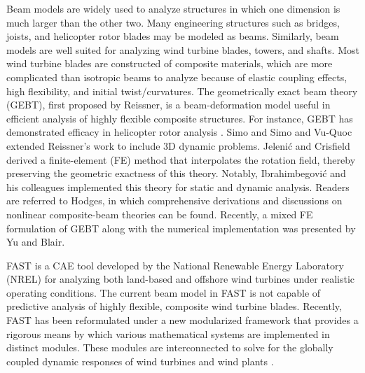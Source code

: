 \documentclass{aiaa-tc}
\begin{document}
Beam models are widely used to analyze structures in which one dimension is much larger than the other two.  Many engineering
structures such as  bridges, joists, and helicopter
rotor blades may be modeled as beams.  Similarly, beam models are well suited for analyzing wind turbine blades, towers, and shafts.  Most wind turbine
blades are constructed of composite materials, which are more complicated than isotropic beams to analyze because of elastic coupling
effects, high flexibility, and initial twist/curvatures.  The geometrically exact beam theory (GEBT), first proposed by
Reissner\cite{Ressiner1973}, is a beam-deformation model useful in efficient analysis of highly flexible composite structures.
For instance, GEBT has demonstrated efficacy in helicopter rotor analysis \cite{Hodges:2007}. 
Simo\cite{Simo1985} and Simo and Vu-Quoc\cite{Simo1986} extended Reissner's
work to include 3D dynamic problems. Jeleni\'c and
Crisfield\cite{Crisfield1999} derived a finite-element (FE) method that
interpolates the rotation field, thereby preserving the geometric exactness
of this theory. Notably, Ibrahimbegovi\'c and his colleagues
implemented this theory for static\cite{Ibrahim1995} and
dynamic\cite{Ibrahim1998} analysis. Readers are referred to
Hodges\cite{HodgesBeamBook}, in which comprehensive derivations and discussions
on nonlinear composite-beam theories can be found. Recently, a mixed
 FE formulation of GEBT along with the numerical implementation was presented by
Yu and Blair\cite{YuGEBT}.  

FAST is a CAE tool developed by the National Renewable Energy Laboratory
(NREL) for analyzing both land-based and
offshore wind turbines under realistic operating conditions.  The current
beam model in FAST is not capable of predictive analysis of highly flexible,
composite wind turbine blades.
Recently, FAST has been reformulated under a
new modularized framework that provides a rigorous means by which various
mathematical systems are implemented in distinct modules. These modules are interconnected
to solve for the globally coupled dynamic responses of wind turbines and wind
plants \cite{Jonkman:2013,website:FASTModularizationFramework}.
\end{document}
